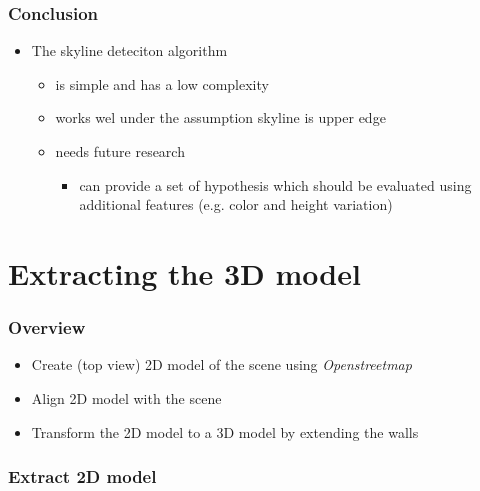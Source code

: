 \documentclass{beamer}
\begin{document}
\frame
{
	\frametitle{Conclusion}
	\begin{itemize}
	\item <+-| alert@+> The skyline deteciton algorithm 
		\begin{itemize}
		\item <+-| alert@+> is simple and has a low complexity
		\item <+-| alert@+> works wel under the assumption skyline is upper edge
		\item <+-| alert@+> needs future research
			\begin{itemize}
			\item <+-| alert@+> can provide a set of hypothesis which should be evaluated using additional features
			(e.g. color and height variation)
			\end{itemize}
		\end{itemize}
	\end{itemize}
}





\section{Extracting the 3D model}
\frame
{
	\frametitle{Overview}
	\begin{itemize}
	\item <+-| alert@+> Create (top view) 2D model of the scene using \emph{Openstreetmap}
	\item <+-| alert@+> Align 2D model with the scene 
	\item <+-| alert@+> Transform the 2D model to a 3D model by extending the walls
	\end{itemize}
}

\frame
{
	\frametitle{Extract 2D model}
}
\end{document}
